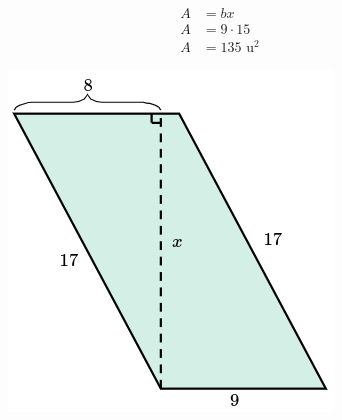 \begin{solutionbox}{13cm}
\begin{minipage}{0.6\textwidth}
        \begin{align*}
            A & =bx              \\
            A & =9\cdot 15       \\
            A & =135 \text{ u}^2
        \end{align*}
    \end{minipage}\hfill
    \begin{minipage}{0.35\textwidth}
        \begin{figure}[H]
            \centering
            \includegraphics[width=0.9\linewidth]{../images/area_compuesta_01a.png}
            \caption{}
            \label{fig:area_compuesta_01a}
        \end{figure}
    \end{minipage}

\end{solutionbox}